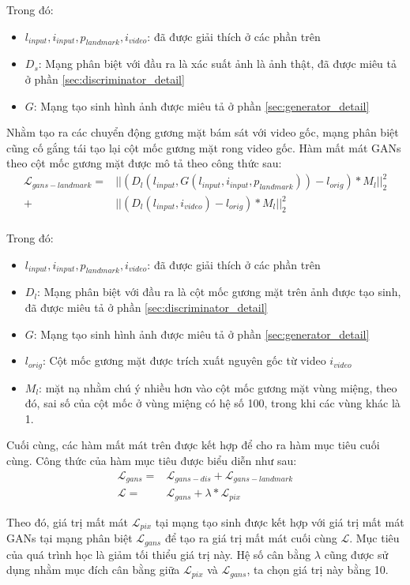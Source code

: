 Trong đó:
\begin{itemize}
    \item \textbf{$l_{input},i_{input},p_{landmark},i_{video}$}: đã được giải thích ở các phần trên
    \item \textbf{$D_s$}: Mạng phân biệt với đầu ra là xác suất ảnh là ảnh thật, đã được miêu tả ở phần \ref{sec:discriminator_detail}
    \item \textbf{$G$}: Mạng tạo sinh hình ảnh được miêu tả ở phần \ref{sec:generator_detail}
\end{itemize}

Nhằm tạo ra các chuyển động gương mặt bám sát với video gốc, mạng phân biệt cũng cố gắng tái tạo lại cột mốc gương mặt rong video gốc. Hàm mất mát GANs theo cột mốc gương mặt được mô tả theo công thức sau:
\begin{equation}
    \begin{split}
    \mathcal{L}_{gans-landmark} = &||(D_l(l_{input},G(l_{input},i_{input},p_{landmark})) - l_{orig})*M_l||^2_2\\
    +&||(D_l(l_{input},i_{video}) - l_{orig})*M_l||^2_2\\
    \end{split}
\end{equation}

Trong đó:
\begin{itemize}
    \item \textbf{$l_{input},i_{input},p_{landmark},i_{video}$}: đã được giải thích ở các phần trên
    \item \textbf{$D_l$}: Mạng phân biệt với đầu ra là cột mốc gương mặt trên ảnh được tạo sinh, đã được miêu tả ở phần \ref{sec:discriminator_detail}
    \item \textbf{$G$}: Mạng tạo sinh hình ảnh được miêu tả ở phần \ref{sec:generator_detail}
    \item \textbf{$l_{orig}$}: Cột mốc gương mặt được trích xuất nguyên gốc từ video $i_{video}$
    \item \textbf{$M_l$}: mặt nạ nhằm chú ý nhiều hơn vào cột mốc gương mặt vùng miệng, theo đó, sai số của cột mốc ở vùng miệng có hệ số 100, trong khi các vùng khác là 1.
\end{itemize}

Cuối cùng, các hàm mất mát trên được kết hợp để cho ra hàm mục tiêu cuối cùng. Công thức của hàm mục tiêu được biểu diễn như sau:
\begin{equation}
    \begin{split}
    \mathcal{L}_{gans} = &\mathcal{L}_{gans-dis} + \mathcal{L}_{gans-landmark}\\
    \mathcal{L} = &\mathcal{L}_{gans} + \lambda*\mathcal{L}_{pix}
    \end{split}
\end{equation}

Theo đó, giá trị mất mát $\mathcal{L}_{pix}$ tại mạng tạo sinh được kết hợp với giá trị mất mát GANs tại mạng phân biệt $\mathcal{L}_{gans}$ để tạo ra giá trị mất mát cuối cùng $\mathcal{L}$. Mục tiêu của quá trình học là giảm tối thiểu giá trị này. Hệ số cân bằng $\lambda$ cũng được sử dụng nhằm mục đích cân bằng giữa $\mathcal{L}_{pix}$ và $\mathcal{L}_{gans}$, ta chọn giá trị này bằng 10.
